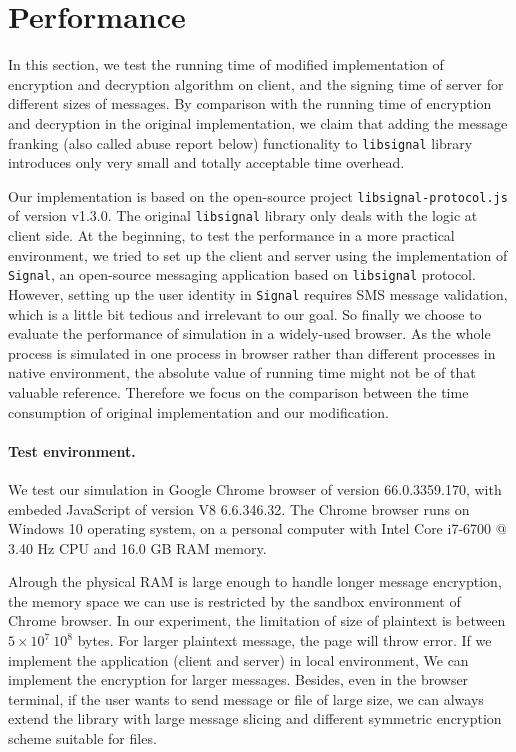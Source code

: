 
\section{Performance}
In this section, we test the running time of modified implementation of encryption and decryption algorithm on client,
and the signing time of server for different sizes of messages.
By comparison with the running time of encryption and decryption in the original implementation,
we claim that adding the message franking (also called abuse report below) functionality to \texttt{libsignal} library introduces only very small and totally acceptable time overhead. 


Our implementation is based on the open-source project \texttt{libsignal-protocol.js} of version v1.3.0.
The original \texttt{libsignal} library only deals with the logic at client side.
At the beginning, to test the performance in a more practical environment,
we tried to set up the client and server using the implementation of \texttt{Signal}, an open-source messaging application based on \texttt{libsignal} protocol.
However, setting up the user identity in \texttt{Signal} requires SMS message validation,
which is a little bit tedious and irrelevant to our goal.
So finally we choose to evaluate the performance of simulation in a widely-used browser.
As the whole process 
is simulated in one process in browser rather than different processes in native environment,
the absolute value of running time might not be of that valuable reference.
Therefore we focus on the comparison between the time consumption of original implementation and our modification.



\paragraph{Test environment.}
We test our simulation in Google Chrome browser of version 66.0.3359.170,
with embeded JavaScript of version V8 6.6.346.32.
The Chrome browser runs on Windows 10 operating system,
on a personal computer with Intel Core i7-6700 @ 3.40 Hz CPU and 16.0 GB RAM memory.


Alrough the physical RAM is large enough to handle longer message encryption,
the memory space we can use is restricted by the sandbox environment of Chrome browser.
In our experiment, the limitation of size of plaintext is between $5 \times 10^7 ~ 10^8$ bytes.
For larger plaintext message, the page will throw error.
If we implement the application (client and server) in local environment,
We can implement the encryption for larger messages.
Besides, even in the browser terminal,
if the user wants to send message or file of large size,
we can always extend the library with large message slicing and different symmetric encryption scheme suitable for files.

